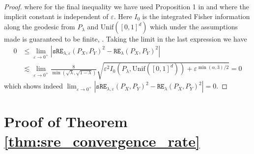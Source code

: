 \documentclass{article}
\theoremstyle{definition}
\newcommand{\sRE}{\mathtt{sRE}_{\lambda,\varepsilon}}
\newcommand{\RE}{\mathtt{RE}_{\lambda}}
\begin{document}
\begin{proof}
    where for the final inequality we have used Proposition 1 in \cite{pooladian2022debiaser} and where the implicit constant is independent of $\varepsilon$. Here $I_0$ is the integrated Fisher information along the geodesic from $P_\lambda$ and $\text{Unif}([0,1]^d)$ which under the assumptions made is guaranteed to be finite, \cite{chizat2020faster, pooladian2021entropic}.
    Taking the limit in the last expression we have
    \begin{align*}
        0 &\leq \lim_{\varepsilon \rightarrow 0^+} |\sRE(P_X,P_Y)^2 - \RE(P_X,P_Y)^2| \\
        &\lesssim \lim_{\varepsilon \rightarrow 0^+} \frac{8}{\min(\sqrt{\lambda}, \sqrt{1-\lambda})} \sqrt{\varepsilon^2I_0(P_\lambda, \text{Unif}([0,1]^d)) + \varepsilon^{\min(\alpha, 3)/2}} = 0
    \end{align*}
    which shows indeed $\lim_{\varepsilon \rightarrow 0^+} |\sRE(P_X,P_Y)^2 - \RE(P_X,P_Y)^2| = 0.$
\end{proof}


\section{Proof of Theorem \ref{thm:sre_convergence_rate}} \label{sec:sre_cr_proof}
\end{document}
